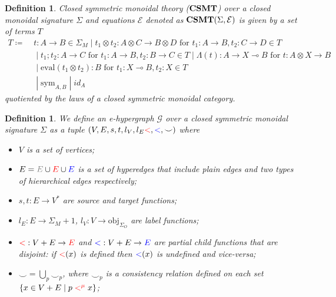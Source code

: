 \documentclass[peerreviewcls]{IEEEtran}
\newtheorem{definition}[theorem]{Definition}
\newcommand{\consistency}{{\smile}}
\begin{document}
\begin{definition}
 Closed symmetric monoidal theory ($\mathbf{CSMT}$) over a closed monoidal signature $\Sigma$ and equations $\mathcal{E}$ denoted as $\mathbf{CSMT}(\Sigma, \mathcal{E})$ is given by a set of terms $T$
 \begin{align*}
 T \coloneq\; &t : A \to B \in \Sigma_{M} \;|\; t_1 \otimes t_2 : A \otimes C \to B \otimes D \text{ for } t_{1} : A \to B, t_{2} : C \to D \in T\\
            & \;|\; t_{1};t_{2} : A \to C \text{ for } t_{1} : A \to B, t_{2} : B \to C \in T \; | \;  \Lambda(t) : A \to X \multimap B \text{ for } t : A \otimes X \to B \\
            &  \;|\; \text{eval}(t_1 \otimes t_2) : B \text{ for } t_1 : X \multimap B, t_2 : X \in T \\
            &  \;|\; \text{sym}_{A,B} \;|\; id_{A}
 \end{align*}
 quotiented by the laws of a closed symmetric monoidal category.
\end{definition}
\begin{definition}

We define an e-hypergraph $\mathcal{G}$ over a closed symmetric monoidal signature $\Sigma$ as a tuple $(V,E,s,t, l_{V}, l_{E} \textcolor{red}{<}, \textcolor{blue}{<},\consistency)$ where
\begin{itemize}
  \item $V$ is a set of vertices;
  \item $E = \textcolor{gray}{E} \cup \textcolor{red}{E} \cup \textcolor{blue}{E}$ is a set of hyperedges that include \textit{plain} edges and two types of \textit{hierarchical} edges respectively;
  \item $s,t : E \to V^{*}$ are source and target functions;
  \item $l_{E} : E \to \Sigma_{M} + 1$, $l_{V} : V \to \text{obj}_{\Sigma_{O}}$ are \textit{label} functions;
  \item $\textcolor{red}{<} : V + E \to \textcolor{red}{E}$ and $\textcolor{blue}{<} : V + E \to \textcolor{blue}{E}$ are partial \textit{child} functions that are disjoint: if $\textcolor{red}{<}(x)$ is defined then $\textcolor{blue}{<}(x)$ is undefined and vice-versa;
  \item $\consistency = \bigcup_{p} \consistency_{p}$, where $\consistency_{p}$ is a \textit{consistency} relation defined on each set $\{x \in V + E \;|\; p \;\textcolor{red}{<^{\mu}}\; x\}$;
\end{itemize} 
\end{definition}
\end{document}
